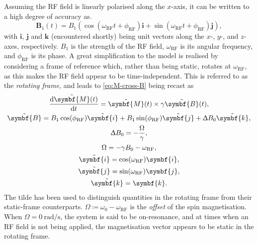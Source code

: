 Assuming the \ac{RF} field is linearly polarised along the $x$-axis, it can be
written to a high degree of accuracy as.
\begin{equation}
    \symbf{B}_1(t) = B_1\left(
        \cos(\omega_{\text{RF}} t + \phi_{\text{RF}}) \symbf{i} +
        \sin(\omega_{\text{RF}} t + \phi_{\text{RF}}) \symbf{j}
    \right),
\end{equation}
with $\symbf{i}$, $\symbf{j}$ and $\symbf{k}$ (encountered shortly) being unit
vectors along the $x$-, $y$-, and $z$-axes, respectively. $B_1$ is the strength
of the \ac{RF} field, $\omega_{\text{RF}}$ is its angular frequency, and
$\phi_{\text{RF}}$ is its phase.
A great simplification to the model is realised by considering a frame
of reference which, rather than being static, rotates at $\omega_{\text{RF}}$,
as this makes the \ac{RF} field appear to be time-independent. This is referred
to as the \emph{rotating frame}, and leads to \cref{eq:M-cross-B} being recast
as
\begin{subequations}
    \begin{gather}
        \frac{\mathrm{d}\tilde{\symbf{M}}(t)}{\mathrm{d}t} = \tilde{\symbf{M}}(t) \times \gamma \tilde{\symbf{B}}(t),\\
        \tilde{\symbf{B}} =
            B_1 \cos(\phi_{\text{RF}}) \tilde{\symbf{i}} +
            B_1 \sin(\phi_{\text{RF}}) \tilde{\symbf{j}} +
            \Updelta B_0 \tilde{\symbf{k}},\\
        \Updelta B_0 = -\frac{\Omega}{\gamma},\\
        \Omega = -\gamma B_0 - \omega_{\text{RF}},\\
        \tilde{\symbf{i}} = \cos(\omega_{\text{RF}}) \symbf{i},\\
        \tilde{\symbf{j}} = \sin(\omega_{\text{RF}}) \symbf{j},\\
        \tilde{\symbf{k}} = \symbf{k}.
    \end{gather}%
    \label{eq:rot-frame}%
\end{subequations}%
The tilde has been used to distinguish quantities in the rotating frame from
their static-frame counterparts.
$\Omega \coloneq \omega_0 - \omega_{\text{RF}}$ is the \emph{offset} of the spin
magnetisation. When $\Omega = \qty{0}{\radian\per\second}$, the system is said to
be on-resonance, and at times when an \ac{RF} field is not being applied, the
magnetisation vector appears to be static in the rotating frame.

